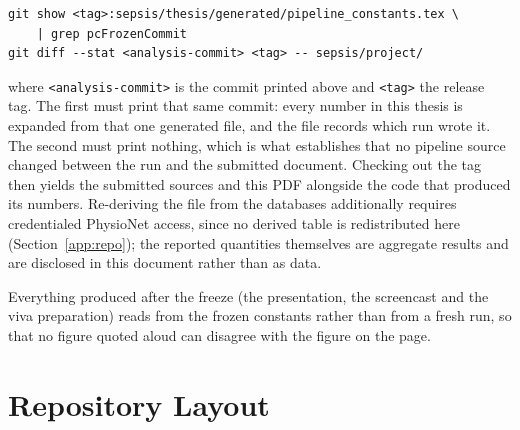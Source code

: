\begin{verbatim}
git show <tag>:sepsis/thesis/generated/pipeline_constants.tex \
    | grep pcFrozenCommit
git diff --stat <analysis-commit> <tag> -- sepsis/project/
\end{verbatim}

\noindent where \texttt{<analysis-commit>} is the commit printed above and
\texttt{<tag>} the release tag. The first must print that same commit: every
number in this thesis is expanded from that one generated file, and the file
records which run wrote it. The second must print nothing, which is what
establishes that no pipeline source changed between the run and the submitted
document. Checking out the tag then yields the submitted sources and this PDF
alongside the code that produced its numbers. Re-deriving the file from the databases additionally
requires credentialed PhysioNet access, since no derived table is redistributed
here (Section~\ref{app:repo}); the reported quantities themselves are aggregate
results and are disclosed in this document rather than as data.

Everything produced after the freeze (the presentation, the screencast and
the viva preparation) reads from the frozen constants rather than from a
fresh run, so that no figure quoted aloud can disagree with the figure on the
page.

\section{Repository Layout}

